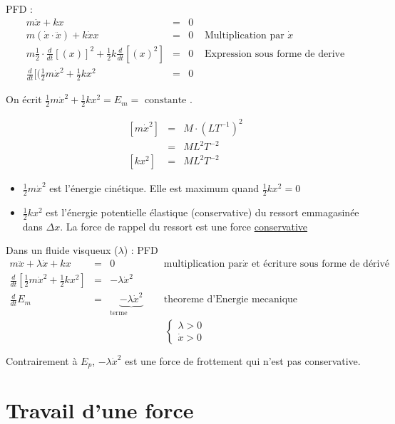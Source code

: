 PFD : \[
	\begin{array}{rclr}
		m\ddot{x} + kx &=& 0\\
		m(\dot{x}\cdot \ddot{x}) + k\dot{x}x &=& 0  & \text{ Multiplication par } \dot{x} \\
		m \frac{1}{2} \cdot \frac{d}{dt}[(x)]^2 + \frac{1}{2}k\frac{d}{dt}[(x)^2] &=& 0 & \text{ Expression sous forme de derive}\\
		\frac{d}{dt}[(\frac{1}{2}m\dot{x}^2 + \frac{1}{2}kx^2 &=& 0
\end{array}\]

On écrit $\frac{1}{2}m\dot{x}^2 + \frac{1}{2}kx^2 = E_m = \text{ constante }$.

\[
	\begin{array}{rcl}
		{[m\dot{x}^2]} &=& M\cdot(LT^{-1})^2 \\
							  &=& ML^2T^{-2} \\
		{[kx^2]} &=& ML^2T^{-2}
	\end{array}
\]

\begin{itemize}
	\item $\frac{1}{2}m\dot{x}^2$ est l'énergie cinétique. Elle est maximum quand $\frac{1}{2}kx^2 = 0$
	\item $\frac{1}{2}kx^2$ est l'énergie potentielle élastique (conservative) du ressort emmagasinée dans $\Delta x$. La force de rappel du ressort est une force \ul{conservative}
\end{itemize}

Dans un fluide visqueux ($\lambda$) : PFD\[
	\begin{array}{rclr}
		m\ddot{x} + \lambda \dot{x} + kx &=& 0 & \text{ multiplication par} \dot{x} \text{ et écriture sous forme de dérivé} \\
		\frac{d}{dt}[\frac{1}{2}m\dot{x}^2 + \frac{1}{2}kx^2] &=& -\lambda \dot{x}^2 \\
		\frac{d}{dt}E_m &=& \underbrace{-\lambda\dot{x}^2}_{\text{terme dissipatif}} & \text{ theoreme d'Energie mecanique }
	\end{array}
\]
\[
	\left\{
		\begin{array}{c}
			\lambda > 0 \\
			\dot{x} > 0
	\end{array}\right.\]

	Contrairement à $E_p$, $-\lambda \dot{x}^2$ est une force de frottement qui n'est pas conservative.

\section{Travail d'une force}

